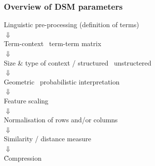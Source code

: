 \begin{frame}
  \frametitle{Overview of DSM parameters}

  \ungap[1]
  \begin{center}
    Linguistic pre-processing (definition of terms)\\
    $\Downarrow$\\
    Term-context \vs\ term-term matrix\\
    $\Downarrow$\\
    Size \& type of context / structured \vs\ unstructered\\
    $\Downarrow$\\
    Geometric \vs\ probabilistic interpretation\\
    $\Downarrow$\\
    Feature scaling\\
    $\Downarrow$\\
    Normalisation of rows and/or columns\\
    $\Downarrow$\\
    Similarity / distance measure\\
    $\Downarrow$\\
    \h{Compression}
  \end{center}
\end{frame}

